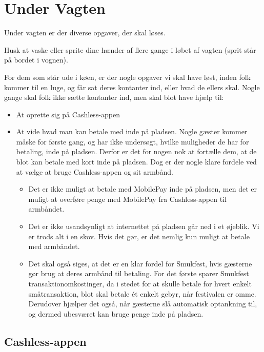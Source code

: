 \section{Under Vagten}
\label{sec:intra-barvagten}

Under vagten er der diverse opgaver, der skal løses.

Husk at vaske eller sprite dine hænder af flere gange 
i løbet af vagten (sprit står på bordet i vognen).

For dem som står ude i køen, er der nogle opgaver vi skal have løst, inden folk kommer til 
en luge, og får sat deres kontanter ind, eller hvad de ellers skal.
Nogle gange skal folk ikke sætte kontanter ind, men skal blot have hjælp 
til:
\begin{itemize}
  \item At oprette sig på Cashless-appen
  \item At vide hvad man kan betale med inde på pladsen. Nogle gæster kommer måske for første gang, 
  og har ikke undersøgt, hvilke muligheder de har for betaling, inde på pladsen.
  Derfor er det for nogen nok at fortælle dem, at de blot kan betale med kort inde på pladsen.
  Dog er der nogle klare fordele ved at vælge at bruge Cashless-appen og sit armbånd.
  \begin{itemize}
    \item Det er ikke muligt at betale med MobilePay inde på pladsen, men det er muligt at 
    overføre penge med MobilePay fra Cashless-appen til armbåndet.
    \item Det er ikke usandsynligt at internettet på pladsen går ned i et øjeblik. Vi er 
    trods alt i en skov. Hvis det gør, er det nemlig kun muligt at betale med armbåndet.
    \item Det skal også siges, at det er en klar fordel for Smukfest, hvis gæsterne gør brug at 
    deres armbånd til betaling. For det første sparer Smukfest transaktionomkostinger, da i stedet for 
    at skulle betale for hvert enkelt småtransaktion, blot skal betale ét enkelt gebyr, når festivalen er omme. 
    Derudover hjælper det også, når gæsterne slå automatisk optankning til, og dermed ubesværet
    kan bruge penge inde på pladsen.
  \end{itemize}
\end{itemize}

\subsection{Cashless-appen}

